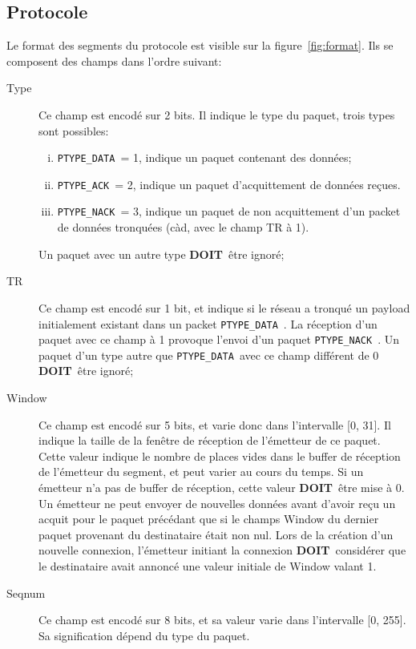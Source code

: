 \documentclass[a4paper,12pt]{article}
\newcommand{\must}{\textbf{DOIT}}
\newcommand{\pdata}{\texttt{PTYPE\_DATA}}
\newcommand{\pack}{\texttt{PTYPE\_ACK}}
\newcommand{\pnack}{\texttt{PTYPE\_NACK}}
\begin{document}
\subsection{Protocole}
Le format des segments du protocole est visible sur la figure~\ref{fig:format}. Ils 
se composent des champs dans l'ordre suivant:
\begin{description}
    \item[Type] Ce champ est encodé sur 2 bits. Il indique le type du paquet,
        trois types sont possibles:
        \begin{enumerate}[(i)]
            \item \pdata\ = 1, indique un paquet contenant des données;
            \item \pack\ = 2, indique un paquet d'acquittement de données
                reçues.
            \item \pnack\ = 3, indique un paquet de non acquittement d'un packet de données tronquées (càd, avec le champ TR à 1).
        \end{enumerate}
        Un paquet avec un autre type \must\ être ignoré;
    \item[TR] Ce champ est encodé sur 1 bit, et indique si le réseau a tronqué un payload initialement existant dans un packet \pdata\ .  
	    La réception d'un paquet avec ce champ à 1 provoque l'envoi d'un paquet \pnack\ .
	    Un paquet d'un type autre que \pdata\ avec ce champ différent de 0 \must\ être ignoré;
    \item[Window] Ce champ est encodé sur 5 bits, et varie donc dans l'intervalle [0, 31].
        Il indique la taille de la fenêtre de réception de l'émetteur de ce paquet.
        Cette valeur indique le nombre de places vides dans le buffer de réception de
        l'émetteur du segment, et peut varier au cours du temps.
        Si un émetteur n'a pas de buffer de réception, cette valeur \must\ être mise à 0.
        Un émetteur ne peut envoyer de nouvelles données avant d'avoir reçu un acquit pour le
        paquet précédant que si le champs Window du dernier paquet provenant
        du destinataire était non nul. Lors de la création d'un nouvelle connexion,
        l'émetteur initiant la connexion \must\ considérer que le destinataire avait annoncé une
        valeur initiale de Window valant 1.
    \item[Seqnum] Ce champ est encodé sur 8 bits, et sa valeur varie dans l'intervalle [0, 255].
        Sa signification dépend du type du paquet.
        \begin{description}

\end{description}
\end{description}
\end{document}
